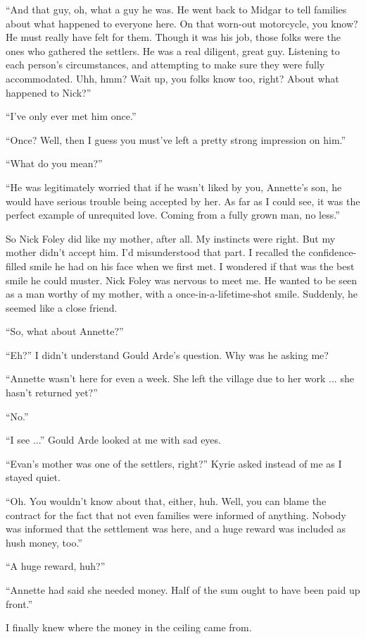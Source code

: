 \documentclass[oneside]{book}
\begin{document}
“And that guy, oh, what a guy he was. He went back to Midgar to tell families about what happened to everyone here. On that worn-out motorcycle, you know? He must really have felt for them. Though it was his job, those folks were the ones who gathered the settlers. He was a real diligent, great guy. Listening to each person’s circumstances, and attempting to make sure they were fully accommodated. Uhh, hmm?
Wait up, you folks know too, right? About what happened to Nick?”

“I’ve only ever met him once.”

“Once? Well, then I guess you must’ve left a pretty strong impression on him.”

“What do you mean?”

“He was legitimately worried that if he wasn’t liked by you, Annette’s son, he would have serious trouble being accepted by her. As far as I could see, it was the perfect example of unrequited love. Coming from a fully grown man, no less.”

So Nick Foley did like my mother, after all. My instincts were right. But my mother didn’t accept him. I’d misunderstood that part. I recalled the confidence-filled smile he had on his face when we first met. I wondered if that was the best smile he could muster. Nick Foley was nervous to meet me. He wanted to be seen as a man worthy of my mother, with a once-in-a-lifetime-shot smile. Suddenly, he seemed like a close friend.

“So, what about Annette?”

“Eh?” I didn’t understand Gould Arde’s question. Why was he asking me?

“Annette wasn’t here for even a week. She left the village due to her work ... she hasn’t returned yet?”

“No.”

“I see ...” Gould Arde looked at me with sad eyes.

“Evan’s mother was one of the settlers, right?” Kyrie asked instead of me as I stayed quiet.

“Oh. You wouldn’t know about that, either, huh. Well, you can blame the contract for the fact that not even families were informed of anything. Nobody was informed that the settlement was here, and a huge reward was included as hush money, too.”

“A huge reward, huh?”

“Annette had said she needed money. Half of the sum ought to have been paid up front.”

I finally knew where the money in the ceiling came from.
\end{document}
